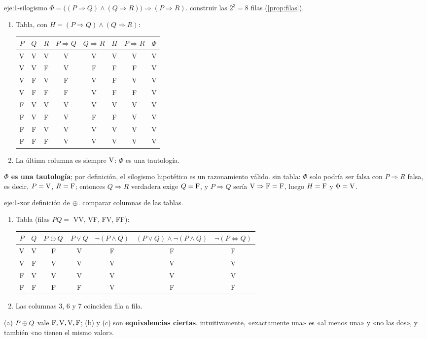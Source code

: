 \begin{solucion}{eje:1-silogismo}
\datos $\Phi=\bigl((P\Rightarrow Q)\wedge(Q\Rightarrow R)\bigr)\Rightarrow(P\Rightarrow R)$.
\planteamiento construir las $2^{3}=8$ filas (\cref{prop:filas}).
\pasos
\begin{enumerate}[label=\arabic*.]
  \item Tabla, con $H=(P\Rightarrow Q)\wedge(Q\Rightarrow R)$:
  \begin{center}\small
  \begin{tabular}{@{}ccc|ccccc@{}}
  \toprule
  $P$&$Q$&$R$&$P\Rightarrow Q$&$Q\Rightarrow R$&$H$&$P\Rightarrow R$&$\Phi$\\
  \midrule
  V&V&V&V&V&V&V&V\\
  V&V&F&V&F&F&F&V\\
  V&F&V&F&V&F&V&V\\
  V&F&F&F&V&F&F&V\\
  F&V&V&V&V&V&V&V\\
  F&V&F&V&F&F&V&V\\
  F&F&V&V&V&V&V&V\\
  F&F&F&V&V&V&V&V\\
  \bottomrule
  \end{tabular}
  \end{center}
  \item La última columna es siempre $\mathrm{V}$: $\Phi$ es una tautología.
\end{enumerate}
\resultado \textbf{$\Phi$ es una tautología}; por definición, el silogismo hipotético es un razonamiento válido.
\comprobacion sin tabla: $\Phi$ solo podría ser falsa con $P\Rightarrow R$ falsa, es decir, $P=\mathrm{V}$, $R=\mathrm{F}$; entonces $Q\Rightarrow R$ verdadera exige $Q=\mathrm{F}$, y $P\Rightarrow Q$ sería $\mathrm{V}\Rightarrow\mathrm{F}=\mathrm{F}$, luego $H=\mathrm{F}$ y $\Phi=\mathrm{V}$.
\end{solucion}

\begin{solucion}{eje:1-xor}
\datos definición de $\oplus$.
\planteamiento comparar columnas de las tablas.
\pasos
\begin{enumerate}[label=\arabic*.]
  \item Tabla (filas $PQ=$ VV, VF, FV, FF):
  \begin{center}\small
  \begin{tabular}{@{}cc|ccccc@{}}
  \toprule
  $P$&$Q$&$P\oplus Q$&$P\vee Q$&$\neg(P\wedge Q)$&$(P\vee Q)\wedge\neg(P\wedge Q)$&$\neg(P\Leftrightarrow Q)$\\
  \midrule
  V&V&F&V&F&F&F\\
  V&F&V&V&V&V&V\\
  F&V&V&V&V&V&V\\
  F&F&F&F&V&F&F\\
  \bottomrule
  \end{tabular}
  \end{center}
  \item Las columnas 3, 6 y 7 coinciden fila a fila.
\end{enumerate}
\resultado (a) $P\oplus Q$ vale $\mathrm{F},\mathrm{V},\mathrm{V},\mathrm{F}$; (b) y (c) son \textbf{equivalencias ciertas}.
\comprobacion intuitivamente, «exactamente una» es «al menos una» y «no las dos», y también «no tienen el mismo valor».
\end{solucion}

